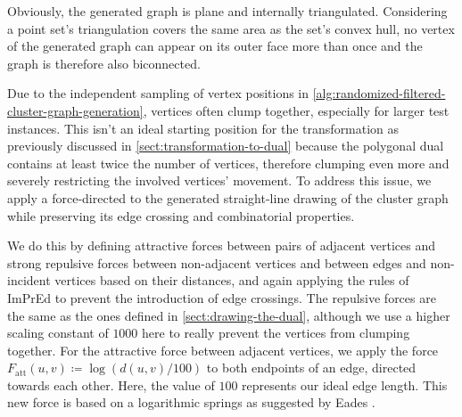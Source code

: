 Obviously, the generated graph is plane and internally triangulated.
Considering a point set's triangulation covers the same area as the set's convex hull, no vertex of the generated graph can appear on its outer face more than once and the graph is therefore also biconnected.

Due to the independent sampling of vertex positions in \cref{alg:randomized-filtered-cluster-graph-generation}, vertices often clump together, especially for larger test instances.
This isn't an ideal starting position for the transformation as previously discussed in \cref{sect:transformation-to-dual} because the polygonal dual contains at least twice the number of vertices, therefore clumping even more and severely restricting the involved vertices' movement.
To address this issue, we apply a force-directed  to the generated straight-line drawing \clusterdrawing{} of the cluster graph while preserving its edge crossing and combinatorial properties.

We do this by defining attractive forces between pairs of adjacent vertices and strong repulsive forces between non-adjacent vertices and between edges and non-incident vertices based on their distances, and again applying the rules of ImPrEd \cite{simonetto2011impred} to prevent the introduction of edge crossings.
The repulsive forces are the same as the ones defined in \cref{sect:drawing-the-dual}, although we use a higher scaling constant of $1000$ here to really prevent the vertices from clumping together.
For the attractive force between adjacent vertices, we apply the force $F_\text{att}(u,v) \coloneqq \log(d(u,v) / 100)$ to both endpoints of an edge, directed towards each other.
Here, the value of $100$ represents our ideal edge length.
This new force is based on a logarithmic springs as suggested by Eades \cite{eades84heuristic}.

\vfill

